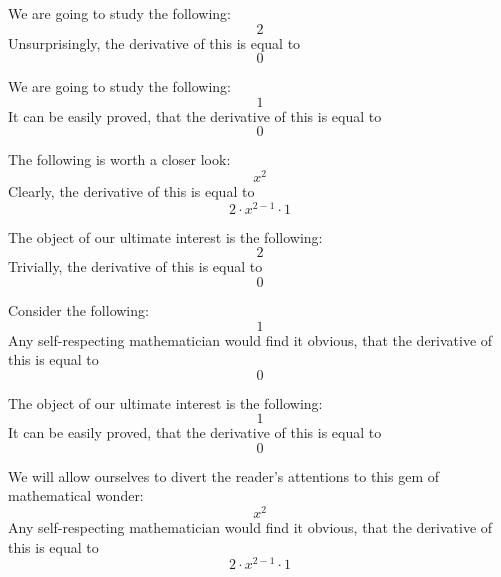 \documentclass{article}
\begin{document}
We are going to study the following:
\begin{equation}
2 
\end{equation}
Unsurprisingly, the derivative of this is equal to
\begin{equation}
0 
\end{equation}

We are going to study the following:
\begin{equation}
1 
\end{equation}
It can be easily proved, that the derivative of this is equal to
\begin{equation}
0 
\end{equation}

The following is worth a closer look:
\begin{equation}
x ^{2 } 
\end{equation}
Clearly, the derivative of this is equal to
\begin{equation}
2 \cdot x ^{2 - 1 } \cdot 1 
\end{equation}

The object of our ultimate interest is the following:
\begin{equation}
2 
\end{equation}
Trivially, the derivative of this is equal to
\begin{equation}
0 
\end{equation}

Consider the following:
\begin{equation}
1 
\end{equation}
Any self-respecting mathematician would find it obvious, that the derivative of this is equal to
\begin{equation}
0 
\end{equation}

The object of our ultimate interest is the following:
\begin{equation}
1 
\end{equation}
It can be easily proved, that the derivative of this is equal to
\begin{equation}
0 
\end{equation}

We will allow ourselves to divert the reader's attentions to this gem of mathematical wonder:
\begin{equation}
x ^{2 } 
\end{equation}
Any self-respecting mathematician would find it obvious, that the derivative of this is equal to
\begin{equation}
2 \cdot x ^{2 - 1 } \cdot 1 
\end{equation}
\end{document}
